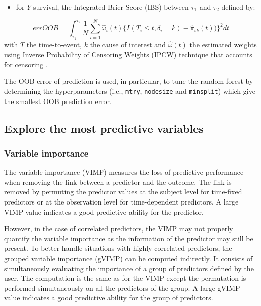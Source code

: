 \begin{itemize}
\tightlist
\item
  for \(Y\) survival, the Integrated Brier Score (IBS) \citep{sene_individualized_2016} between \(\tau_1\) and \(\tau_2\) defined by:
\end{itemize}

\begin{equation}
  errOOB = \int_{\tau_1}^{\tau_2} \frac{1}{N} \sum_{i=1}^{N}  \hat{\omega}_i(t) \Big\{ I(T_i \leq t, \delta_i = k) -
  \hat{\pi}_{ik}(t) \Big) \Big\}^2 dt
\end{equation}
with \(T\) the time-to-event, \(k\) the cause of interest and \(\hat{\omega}(t)\) the estimated weights using Inverse Probability of Censoring Weights (IPCW) technique that accounts for censoring \citep{gerds_consistent_2006}.

The OOB error of prediction is used, in particular, to tune the random forest by determining the hyperparameters (i.e., \texttt{mtry}, \texttt{nodesize} and \texttt{minsplit}) which give the smallest OOB prediction error.

\subsection{Explore the most predictive variables}\label{explore-the-most-predictive-variables}

\subsubsection{Variable importance}\label{variable-importance}

The variable importance (VIMP) measures the loss of predictive performance \citep{ishwaran_random_2008} when removing the link between a predictor and the outcome. The link is removed by permuting the predictor values at the subject level for time-fixed predictors or at the observation level for time-dependent predictors. A large VIMP value indicates a good predictive ability for the predictor.

However, in the case of correlated predictors, the VIMP may not properly quantify the variable importance \citep{gregorutti_correlation_2017} as the information of the predictor may still be present. To better handle situations with highly correlated predictors, the grouped variable importance (gVIMP) can be computed indirectly. It consists of simultaneously evaluating the importance of a group of predictors defined by the user. The computation is the same as for the VIMP except the permutation is performed simultaneously on all the predictors of the group. A large gVIMP value indicates a good predictive ability for the group of predictors.

